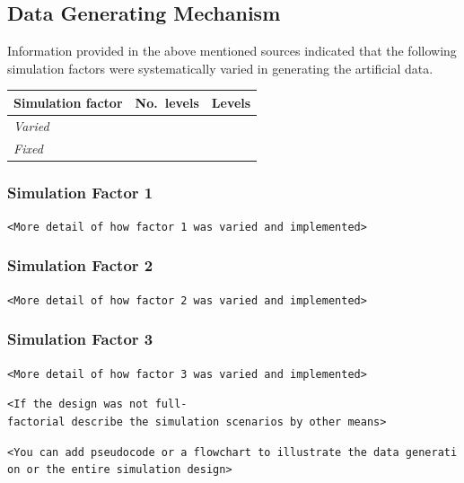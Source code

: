 \documentclass[10,a4paperpaper,]{article}
\begin{document}
\subsection{Data Generating Mechanism}

Information provided in the above mentioned sources indicated that the
following simulation factors were systematically varied in generating
the artificial data.

\begin{longtable}[]{@{}lll@{}}
\toprule
Simulation factor & No.~levels & Levels \\
\midrule
\endhead
\emph{Varied} & & \\
\emph{Fixed} & & \\
\bottomrule
\end{longtable}

\subsubsection{Simulation Factor 1}

\texttt{\textless{}More\ detail\ of\ how\ factor\ 1\ was\ varied\ and\ implemented\textgreater{}}

\subsubsection{Simulation Factor 2}

\texttt{\textless{}More\ detail\ of\ how\ factor\ 2\ was\ varied\ and\ implemented\textgreater{}}

\subsubsection{Simulation Factor 3}

\texttt{\textless{}More\ detail\ of\ how\ factor\ 3\ was\ varied\ and\ implemented\textgreater{}}

\texttt{\textless{}If\ the\ design\ was\ not\ full-factorial\ describe\ the\ simulation\ scenarios\ by\ other\ means\textgreater{}}

\texttt{\textless{}You\ can\ add\ pseudocode\ or\ a\ flowchart\ to\ illustrate\ the\ data\ generation\ or\ the\ entire\ simulation\ design\textgreater{}}
\end{document}
